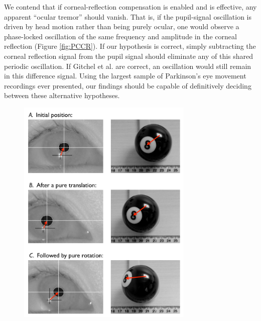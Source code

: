 \documentclass[jou,a4paper]{apa6}
\begin{document}
We contend that if corneal-reflection compensation is enabled and is effective, any apparent ``ocular tremor'' should vanish. That is, if the pupil-signal oscillation is driven by head motion rather than being purely ocular, one would observe a phase-locked oscillation of the same frequency and amplitude in the corneal reflection (Figure \ref{fig:PCCR}). If our hypothesis is correct, simply subtracting the corneal reflection signal from the pupil signal should eliminate any of this shared periodic oscillation. If Gitchel et al. are correct, an oscillation would still remain in this difference signal. Using the largest sample of Parkinson's eye movement recordings ever presented, our findings should be capable of definitively deciding between these alternative hypotheses.


\begin{figure}[htbp]
\begin{center}
\includegraphics [width=0.75\textwidth]{Figures/Figure_1_Explanatory}

\end{center}
\end{figure}
\end{document}
